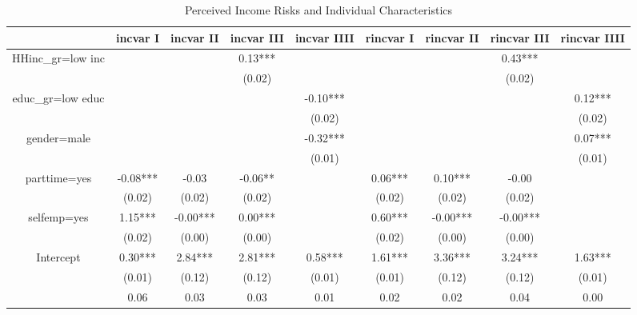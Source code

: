 \begin{table}[p]
\centering
\begin{adjustbox}{width=\textwidth}
\begin{threeparttable}
\caption{Perceived Income Risks and Individual Characteristics}
\label{micro_reg}\begin{tabular}{ccccccccc}
\toprule
{} &  incvar I & incvar II & incvar III & incvar IIII & rincvar I & rincvar II & rincvar III & rincvar IIII \\
\midrule
HHinc\_gr=low inc &           &           &    0.13*** &             &           &            &     0.43*** &              \\
                 &           &           &     (0.02) &             &           &            &      (0.02) &              \\
educ\_gr=low educ &           &           &            &    -0.10*** &           &            &             &      0.12*** \\
                 &           &           &            &      (0.02) &           &            &             &       (0.02) \\
gender=male      &           &           &            &    -0.32*** &           &            &             &      0.07*** \\
                 &           &           &            &      (0.01) &           &            &             &       (0.01) \\
parttime=yes     &  -0.08*** &     -0.03 &    -0.06** &             &   0.06*** &    0.10*** &       -0.00 &              \\
                 &    (0.02) &    (0.02) &     (0.02) &             &    (0.02) &     (0.02) &      (0.02) &              \\
selfemp=yes      &   1.15*** &  -0.00*** &    0.00*** &             &   0.60*** &   -0.00*** &    -0.00*** &              \\
                 &    (0.02) &    (0.00) &     (0.00) &             &    (0.02) &     (0.00) &      (0.00) &              \\
Intercept        &   0.30*** &   2.84*** &    2.81*** &     0.58*** &   1.61*** &    3.36*** &     3.24*** &      1.63*** \\
                 &    (0.01) &    (0.12) &     (0.12) &      (0.01) &    (0.01) &     (0.12) &      (0.12) &       (0.01) \\
                 &      0.06 &      0.03 &       0.03 &        0.01 &      0.02 &       0.02 &        0.04 &         0.00 \\

\end{tabular}
\end{threeparttable}
\end{adjustbox}
\end{table}
